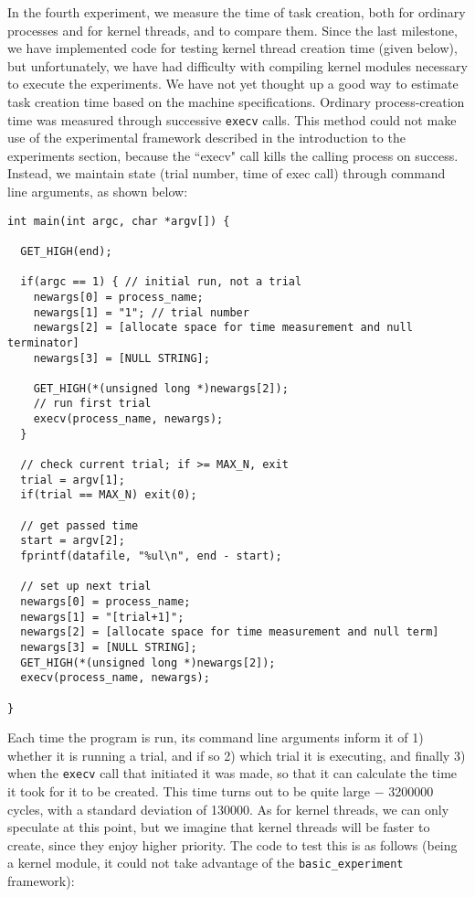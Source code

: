 In the fourth experiment, we measure the time of task creation, both for ordinary processes and for kernel threads, and to compare them. Since the last milestone, we have implemented code for testing kernel thread creation time (given below), but unfortunately, we have had difficulty with compiling kernel modules necessary to execute the experiments. We have not yet thought up a good way to estimate task creation time based on the machine specifications. 
\newline
\newline
Ordinary process-creation time was measured through successive {\tt execv} calls. This method could not make use of the experimental framework described in the introduction to the experiments section, because the ``execv" call kills the calling process on success. Instead, we maintain state (trial number, time of exec call) through command line arguments, as shown below:

\noindent \begin{verbatim}
int main(int argc, char *argv[]) {

  GET_HIGH(end);

  if(argc == 1) { // initial run, not a trial
    newargs[0] = process_name;
    newargs[1] = "1"; // trial number
    newargs[2] = [allocate space for time measurement and null terminator]
    newargs[3] = [NULL STRING];

    GET_HIGH(*(unsigned long *)newargs[2]);
    // run first trial
    execv(process_name, newargs);
  }

  // check current trial; if >= MAX_N, exit
  trial = argv[1];
  if(trial == MAX_N) exit(0);

  // get passed time
  start = argv[2];
  fprintf(datafile, "%ul\n", end - start);

  // set up next trial
  newargs[0] = process_name;
  newargs[1] = "[trial+1]";
  newargs[2] = [allocate space for time measurement and null term]
  newargs[3] = [NULL STRING];
  GET_HIGH(*(unsigned long *)newargs[2]);
  execv(process_name, newargs);

}
\end{verbatim}

\newpage

Each time the program is run, its command line arguments inform it of 1) whether it is running a trial, and if so 2) which trial it is executing, and finally 3) when the {\tt execv} call that initiated it was made, so that it can calculate the time it took for it to be created.
\newline
\newline
This time turns out to be quite large $-$ 3200000 cycles, with a standard deviation of 130000. 
\newline
\newline
As for kernel threads, we can only speculate at this point, but we imagine that kernel threads will be faster to create, since they enjoy higher priority. The code to test this is as follows (being a kernel module, it could not take advantage of the {\tt basic\_experiment} framework):

